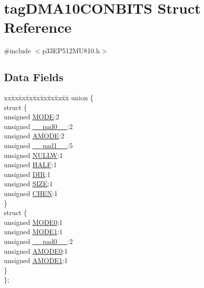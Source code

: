 \hypertarget{structtag_d_m_a10_c_o_n_b_i_t_s}{}\section{tag\+D\+M\+A10\+C\+O\+N\+B\+I\+TS Struct Reference}
\label{structtag_d_m_a10_c_o_n_b_i_t_s}


{\ttfamily \#include $<$p33\+E\+P512\+M\+U810.\+h$>$}

\subsection*{Data Fields}
\begin{DoxyCompactItemize}
\item 
\begin{tabbing}
xx\=xx\=xx\=xx\=xx\=xx\=xx\=xx\=xx\=\kill
union \{\\
\>struct \{\\
\>\>unsigned \hyperlink{structtag_d_m_a10_c_o_n_b_i_t_s_adc56ba18ff3f1599c85d222bee624424}{MODE}:2\\
\>\>unsigned \hyperlink{structtag_d_m_a10_c_o_n_b_i_t_s_adf71f3d8410c1f1dbbc96680a92c49af}{\_\_pad0\_\_}:2\\
\>\>unsigned \hyperlink{structtag_d_m_a10_c_o_n_b_i_t_s_ab3ff4e1f1b9a1037418ca7b6cb2e8f77}{AMODE}:2\\
\>\>unsigned \hyperlink{structtag_d_m_a10_c_o_n_b_i_t_s_acaf2d0924a107ec6e8d2e31febaf66f9}{\_\_pad1\_\_}:5\\
\>\>unsigned \hyperlink{structtag_d_m_a10_c_o_n_b_i_t_s_a1d3f7d04416314131889d1671a9287ad}{NULLW}:1\\
\>\>unsigned \hyperlink{structtag_d_m_a10_c_o_n_b_i_t_s_a1a715a64b2576f59401ac93d6f9a086a}{HALF}:1\\
\>\>unsigned \hyperlink{structtag_d_m_a10_c_o_n_b_i_t_s_ad6868749602045a76f36ffdf964dfd39}{DIR}:1\\
\>\>unsigned \hyperlink{structtag_d_m_a10_c_o_n_b_i_t_s_a5863cac6dc2cb330bdd0b1c66da70ffe}{SIZE}:1\\
\>\>unsigned \hyperlink{structtag_d_m_a10_c_o_n_b_i_t_s_a092934036fdfb8df5259db288fe438ca}{CHEN}:1\\
\>\} \\
\>struct \{\\
\>\>unsigned \hyperlink{structtag_d_m_a10_c_o_n_b_i_t_s_abc938903e74bff48935569d0c5b19035}{MODE0}:1\\
\>\>unsigned \hyperlink{structtag_d_m_a10_c_o_n_b_i_t_s_a7a9f7514566d0626724ce6c4b81b5ea2}{MODE1}:1\\
\>\>unsigned \hyperlink{structtag_d_m_a10_c_o_n_b_i_t_s_adf71f3d8410c1f1dbbc96680a92c49af}{\_\_pad0\_\_}:2\\
\>\>unsigned \hyperlink{structtag_d_m_a10_c_o_n_b_i_t_s_a0a1f894a2695c1388a5412244636805b}{AMODE0}:1\\
\>\>unsigned \hyperlink{structtag_d_m_a10_c_o_n_b_i_t_s_a3fde4abc0dc3db6fef6afc28c565ce3e}{AMODE1}:1\\
\>\} \\
\}; \\


\end{tabbing}
\end{DoxyCompactItemize}
